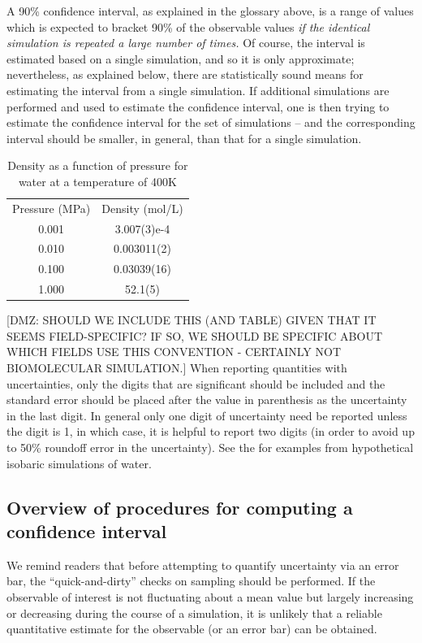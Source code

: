 
A 90\% confidence interval, as explained in the glossary above, is a range of values which is expected to bracket 90\% of the observable values \emph{if the identical simulation is repeated a large number of times.}  Of course, the interval is estimated based on a single simulation, and so it is only approximate; nevertheless, as explained below, there are statistically sound means for estimating the interval from a single simulation.  If additional simulations are performed and used to estimate the confidence interval, one is then trying to estimate the confidence interval for the set of simulations -- and the corresponding interval should be smaller, in general, than that for a single simulation.

\begin{table}
    \begin{tabular}{S S}
      \toprule
       {Pressure (MPa)} & {Density (mol/L)} \\
      0.001 & 3.007(3)e-4 \\
      0.010 & 0.003011(2) \\
      0.100 & 0.03039(16) \\
      1.000 & 52.1(5) \\
      \bottomrule
    \end{tabular}
  \caption{Density as a function of pressure for water at a temperature of 400K}
  \label{tab:uncertainties}
\end{table}

[DMZ: SHOULD WE INCLUDE THIS (AND TABLE) GIVEN THAT IT SEEMS FIELD-SPECIFIC?  IF SO, WE SHOULD BE SPECIFIC ABOUT WHICH FIELDS USE THIS CONVENTION - CERTAINLY NOT BIOMOLECULAR SIMULATION.]
When reporting quantities with uncertainties, only the digits that are significant should be included and the standard error should be placed after the value in parenthesis as the uncertainty in the last digit.  In general only one digit of uncertainty need be reported unless the digit is 1, in which case, it is helpful to report two digits (in order to avoid up to 50\% roundoff error in the uncertainty).  See the  for examples from hypothetical isobaric simulations of water.


\subsection{Overview of procedures for computing a confidence interval}
We remind readers that before attempting to quantify uncertainty via an error bar, the ``quick-and-dirty'' checks on sampling should be performed.
If the observable of interest is not fluctuating about a mean value but largely increasing or decreasing during the course of a simulation, it is unlikely that a reliable quantitative estimate for the observable (or an error bar) can be obtained.

